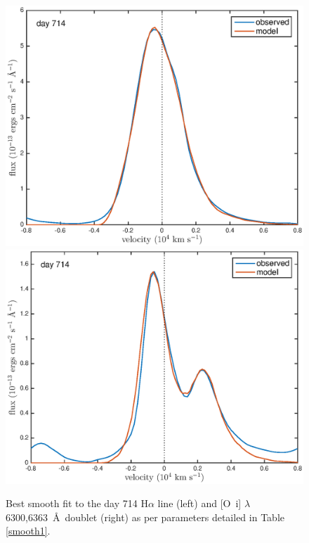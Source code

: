 \documentclass[useAMS,usenatbib,usegraphicx]{mnras}
\begin{document}
\begin{figure}
\begin{center}
\includegraphics[trim =37 10 45 15,clip=true,scale=0.51]{smooth/best_fit/d714Ha}
\includegraphics[trim =37 10 45 15,clip=true,scale=0.51]{smooth/best_fit/d714OI}
\caption{Best smooth fit to the day 714 H$\alpha$ line (left) and 
[O~{\sc i}] $\lambda$6300,6363~\AA\ doublet (right) as per parameters 
detailed in Table \ref{smooth1}.}
\label{d714bf}
\end{center}
\end{figure}
\end{document}
